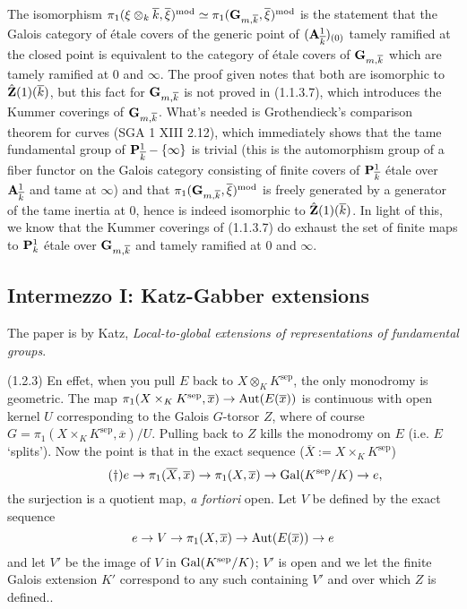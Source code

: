 \documentclass[deligne.tex]{subfiles}
\begin{document}
The isomorphism
$\pi_1(\xi\otimes_k\overline k,\overline\xi)^{\mathrm{mod}}\simeq\pi_1(\mathbf{G}_{m,\overline k},\overline\xi)^{\mathrm{mod}}$
is the statement that the Galois category of étale covers of the generic
point of $(\mathbf{A}^1_{\overline k})_{(0)}$ tamely ramified at the closed point 
is equivalent to the category of étale covers of $\mathbf{G}_{m,\overline k}$
which are tamely ramified at 0 and $\infty$.
The proof given notes that both are isomorphic to $\hat{\mathbf{Z}}(1)(\overline k)$,
but this fact for $\mathbf{G}_{m,\overline k}$ is not proved in (1.1.3.7), which 
introduces the Kummer coverings of $\mathbf{G}_{m,\overline k}$.
What's needed is Grothendieck's
comparison theorem for curves (SGA 1 XIII 2.12), which immediately shows
that the tame fundamental group of $\mathbf{P}^1_{\overline k}-\{\infty\}$ is
trivial (this is the automorphism group of a fiber functor on the Galois
category consisting of finite covers of $\mathbf{P}^1_{\overline k}$ étale over
$\mathbf{A}^1_{\overline k}$ and tame at $\infty$)
and that $\pi_1(\mathbf{G}_{m,\overline k},\overline\xi)^{\mathrm{mod}}$
is freely generated by a generator of the tame inertia at 0, hence is
indeed isomorphic to $\hat{\mathbf{Z}}(1)(\overline k)$.
In light of this, we know that the Kummer coverings of (1.1.3.7) do exhaust
the set of finite maps to $\mathbf{P}^1_k$ étale over $\mathbf{G}_{m,\overline k}$ and
tamely ramified at 0 and $\infty$.

\subsection*{Intermezzo I: Katz-Gabber extensions}
The paper is by Katz,
\emph{Local-to-global extensions of representations of fundamental groups}.

(1.2.3) En effet, when you pull $E$ back to $X\otimes_K K^{\mathrm{sep}}$,
the only monodromy is geometric. The map
$\pi_1(X\times_K K^{\mathrm{sep}},\overline x)\rightarrow\operatorname{Aut}(E(\overline x))$
is continuous with open kernel $U$ corresponding to the Galois $G$-torsor
$Z$, where of course $G=\pi_1(X\times_KK^{\mathrm{sep}},\overline x)/U$.
Pulling back to $Z$ kills the monodromy on $E$ (i.e. $E$ `splits').
Now the point is that in the exact sequence
($\overline X:=X\times_K K^{\mathrm{sep}}$)
\begin{equation*}\label{laumon:pi1ext}\tag{$\dagger$}
	e\rightarrow\pi_1(\overline X,\overline x)\rightarrow\pi_1(X,\overline x)\rightarrow\operatorname{Gal}(K^{\mathrm{sep}}/K)\rightarrow e,
\end{equation*}
the surjection is a quotient map, \emph{a fortiori} open. Let $V$ be 
defined by the exact sequence
\begin{equation*}
	e\rightarrow V\rightarrow\pi_1(X,\overline x)\rightarrow\operatorname{Aut}(E(\overline x))\rightarrow e
\end{equation*}
and let $V'$ be the image of $V$ in $\operatorname{Gal}(K^{\mathrm{sep}}/K)$; $V'$
is open and we let the finite Galois extension $K'$ correspond to any such
containing $V'$ and over which $Z$ is defined..
\end{document}
